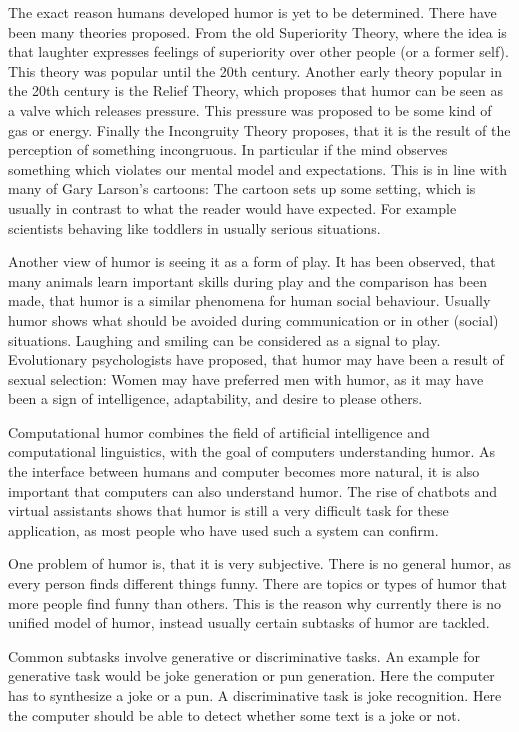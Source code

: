 \documentclass[draft,final,oneside]{vutinfth} %
\begin{document}
The exact reason humans developed humor is yet to be determined. There have been many theories proposed. From the old Superiority Theory, where the idea is that laughter expresses feelings of superiority over other people (or a former self). This theory was popular until the 20th century. Another early theory popular in the 20th century is the Relief Theory, which proposes that humor can be seen as a valve which releases pressure. This pressure was proposed to be some kind of gas or energy. Finally the Incongruity Theory proposes, that it is the result of the perception of something incongruous. In particular if the mind observes something which violates our mental model and expectations. This is in line with many of Gary Larson's cartoons: The cartoon sets up some setting, which is usually in contrast to what the reader would have expected. For example scientists behaving like toddlers in usually serious situations. \cite{sep-humor}

Another view of humor is seeing it as a form of play. It has been observed, that many animals learn important skills during play and the comparison has been made, that humor is a similar phenomena for human social behaviour. Usually humor shows what should be avoided during communication or in other (social) situations. Laughing and smiling can be considered as a signal to play. Evolutionary psychologists have proposed, that humor may have been a result of sexual selection: Women may have preferred men with humor, as it may have been a sign of intelligence, adaptability, and desire to please others. \cite{sep-humor}

Computational humor combines the field of artificial intelligence and computational linguistics, with the goal of computers understanding humor. As the interface between humans and computer becomes more natural, it is also important that computers can also understand humor. The rise of chatbots and virtual assistants shows that humor is still a very difficult task for these application, as most people who have used such a system can confirm.

One problem of humor is, that it is very subjective. There is no general humor, as every person finds different things funny. There are topics or types of humor that more people find funny than others. This is the reason why currently there is no unified model of humor, instead usually certain subtasks of humor are tackled. 

Common subtasks involve generative or discriminative tasks. An example for generative task would be joke generation or pun generation. Here the computer has to synthesize a joke or a pun. A discriminative task is joke recognition. Here the computer should be able to detect whether some text is a joke or not.
\end{document}
